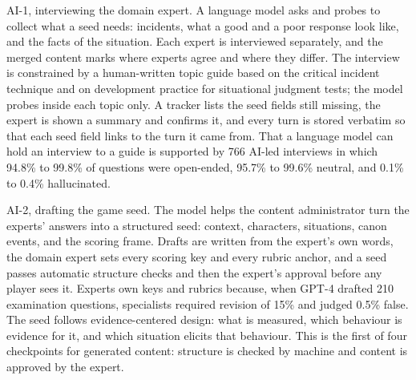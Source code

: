 AI-1, interviewing the domain expert. A language model asks and probes to collect what a seed needs: incidents, what a good and a poor response look like, and the facts of the situation. Each expert is interviewed separately, and the merged content marks where experts agree and where they differ. The interview is constrained by a human-written topic guide based on the critical incident technique\cite{r26} and on development practice for situational judgment tests\cite{r27}; the model probes inside each topic only. A tracker lists the seed fields still missing, the expert is shown a summary and confirms it, and every turn is stored verbatim so that each seed field links to the turn it came from. That a language model can hold an interview to a guide is supported by 766 AI-led interviews in which 94.8\% to 99.8\% of questions were open-ended, 95.7\% to 99.6\% neutral, and 0.1\% to 0.4\% hallucinated\cite{r114}.

AI-2, drafting the game seed. The model helps the content administrator turn the experts' answers into a structured seed: context, characters, situations, canon events, and the scoring frame. Drafts are written from the expert's own words, the domain expert sets every scoring key and every rubric anchor, and a seed passes automatic structure checks and then the expert's approval before any player sees it. Experts own keys and rubrics because, when GPT-4 drafted 210 examination questions, specialists required revision of 15\% and judged 0.5\% false\cite{r115}. The seed follows evidence-centered design: what is measured, which behaviour is evidence for it, and which situation elicits that behaviour\cite{r20,r116}. This is the first of four checkpoints for generated content: structure is checked by machine and content is approved by the expert.

